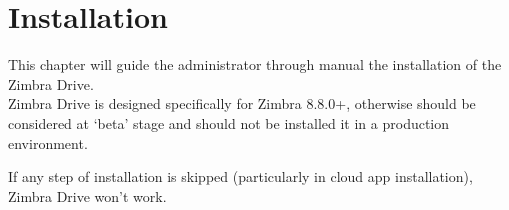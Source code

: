 \chapter{Installation}\label{cha:installation}

This chapter will guide the administrator through manual the installation of the Zimbra Drive.\\
Zimbra Drive is designed specifically for Zimbra 8.8.0+, otherwise should be considered at `beta'
stage and should not be installed it in a production environment.\\
\begin{warning}
If any step of installation is skipped (particularly in cloud app installation), Zimbra Drive won't work.
\end{warning}



